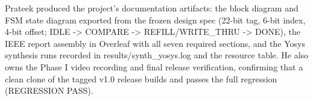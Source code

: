 Prateek produced the project's documentation artifacts: the block diagram
and FSM state diagram exported from the frozen design spec (22-bit tag,
6-bit index, 4-bit offset; IDLE -> COMPARE -> REFILL/WRITE_THRU -> DONE), the
IEEE report assembly in Overleaf with all seven required sections, and the
Yosys synthesis runs recorded in results/synth_yosys.log and the resource
table. He also owns the Phase I video recording and final release
verification, confirming that a clean clone of the tagged v1.0 release
builds and passes the full regression (REGRESSION PASS).
